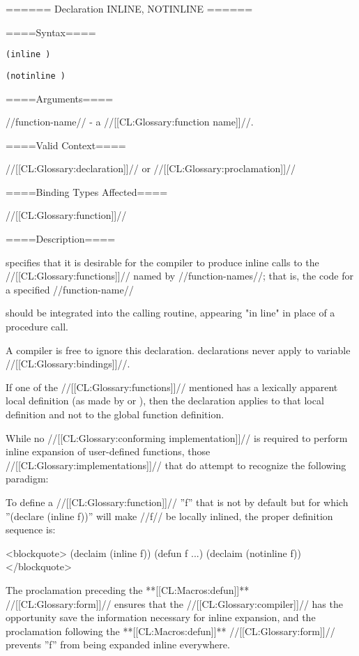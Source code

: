 ====== Declaration INLINE, NOTINLINE ======

====Syntax====

{\tt (inline )}

{\tt (notinline )}

====Arguments====

//function-name// - a //[[CL:Glossary:function name]]//.

====Valid Context====

//[[CL:Glossary:declaration]]// or //[[CL:Glossary:proclamation]]//

====Binding Types Affected====

//[[CL:Glossary:function]]//

====Description====

 specifies that it is desirable for the compiler to produce inline calls to the //[[CL:Glossary:functions]]// named by //function-names//; that is, the code for a specified //function-name//

should be integrated into the calling routine, appearing "in line" in place of a procedure call.

A compiler is free to ignore this declaration.  declarations never apply to variable //[[CL:Glossary:bindings]]//.

If one of the //[[CL:Glossary:functions]]// mentioned has a lexically apparent local definition (as made by  or ), then the declaration applies to that local definition and not to the global function definition.

While no //[[CL:Glossary:conforming implementation]]// is required to perform inline expansion of user-defined functions, those //[[CL:Glossary:implementations]]// that do attempt to recognize the following paradigm:

To define a //[[CL:Glossary:function]]// ''f'' that is not  by default but for which ''(declare (inline f))'' will make //f// be locally inlined, the proper definition sequence is:

<blockquote> (declaim (inline f)) (defun f ...) (declaim (notinline f)) </blockquote>

The  proclamation preceding the **[[CL:Macros:defun]]** //[[CL:Glossary:form]]// ensures that the //[[CL:Glossary:compiler]]// has the opportunity save the information necessary for inline expansion, and the  proclamation following the **[[CL:Macros:defun]]** //[[CL:Glossary:form]]// prevents ''f'' from being expanded inline everywhere.

